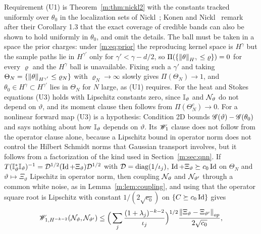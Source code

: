 Requirement (U1) is Theorem~\ref{m:thm:nickl2} with the constants tracked uniformly over $\theta_0$ in the localization sets of Nickl~\cite[Theorem 3]{nicklbvm2024}; Konen and Nickl~\cite{konennickl2026} remark after their Corollary 1.3 that the exact coverage of credible bands can also be shown to hold uniformly in $\theta_0$, and omit the details. The ball must be taken in a space the prior charges: under \eqref{m:eq:prior} the reproducing kernel space is $H^\gamma$ but the sample paths lie in $H^{\gamma'}$ only for $\gamma'<\gamma-d/2$, so $\Pi(\{\left\|\theta\right\|_{H^\gamma}\le\varrho\})=0$ for every $\varrho$ and the $H^\gamma$ ball is unavailable. Fixing such a $\gamma'$ and taking $\Theta_N=\{\left\|\theta\right\|_{H^{\gamma'}}\le\varrho_N\}$ with $\varrho_N\to\infty$ slowly gives $\Pi(\Theta_N)\to1$, and $\theta_0\in H^\gamma\subset H^{\gamma'}$ lies in $\Theta_N$ for $N$ large, as (U1) requires. For the heat and Stokes equations (U3) holds with Lipschitz constants zero, since $\mathbb{I}_\vartheta$ and $\mathcal{N}_\vartheta$ do not depend on $\vartheta$, and its moment clause then follows from $\Pi(\Theta_N^c)\to0$. For a nonlinear forward map (U3) is a hypothesis: Condition 2D bounds $\mathscr{G}(\vartheta)-\mathscr{G}(\theta_0)$ and says nothing about how $\mathbb{I}_\vartheta$ depends on $\vartheta$. Its $\mathscr{W}_1$ clause does not follow from the operator clause alone, because a Lipschitz bound in operator norm does not control the Hilbert Schmidt norms that Gaussian transport involves, but it follows from a factorization of the kind used in Section~\ref{m:sec:qnn}. If $T(\mathbb{I}^*_\vartheta\mathbb{I}_\vartheta)^{-1}=\mathcal D^{1/2}(\operatorname{Id}+\Xi_\vartheta)\mathcal D^{1/2}$ with $\mathcal D=\operatorname{diag}(1/\iota_j)$, $\operatorname{Id}+\Xi_\vartheta\succeq c_0\operatorname{Id}$ on $\Theta_N$ and $\vartheta\mapsto\Xi_\vartheta$ Lipschitz in operator norm, then coupling $\mathcal{N}_\vartheta$ and $\mathcal{N}_{\vartheta'}$ through a common white noise, as in Lemma~\ref{m:lem:coupling}, and using that the operator square root is Lipschitz with constant $1/(2\sqrt{c_0})$ on $\{C\succeq c_0\operatorname{Id}\}$ gives
\[
\mathscr{W}_{1,H^{-k-2}}(\mathcal{N}_\vartheta,\mathcal{N}_{\vartheta'})\le\Big(\sum_j\frac{(1+\lambda_j)^{-k-2}}{\iota_j}\Big)^{1/2}\frac{\left\|\Xi_\vartheta-\Xi_{\vartheta'}\right\|_{op}}{2\sqrt{c_0}} ,
\]
